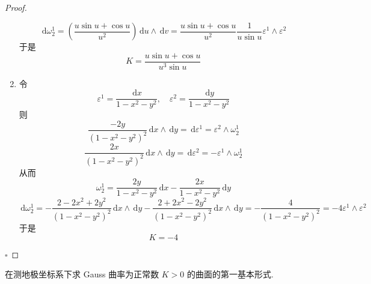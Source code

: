 \documentclass[../../main.tex]{subfiles}
\begin{document}
\begin{proof}
\begin{enumerate}
\[    \,\mathrm{d}  \omega _{2}^{1}= \left( \frac{u\sin u+ \cos u }{u^{2} }  \right)\,\mathrm{d} u\wedge \,\mathrm{d} v= \frac{u\sin u+ \cos u }{u^{2} }\frac{1 }{u\sin u } \varepsilon ^{1}\wedge  \varepsilon ^{2}   
    \]于是\[
    K= \frac{u\sin u+ \cos u }{u^{3}\sin u } 
    \]
    \item 令 \[
     \varepsilon ^{1}= \frac{\,\mathrm{d} x }{1-x^{2}-y^{2} },\quad  \varepsilon ^{2}= \frac{\,\mathrm{d} y }{1-x^{2}-y^{2} }  
    \]则 \[
    \frac{-2y }{\left( 1-x^{2}-y^{2} \right)^{2}  } \,\mathrm{d} x\wedge \,\mathrm{d} y= \,\mathrm{d}  \varepsilon ^{1}=  \varepsilon ^{2}\wedge  \omega _{2}^{1}
    \] \[
    \frac{2x }{\left( 1-x^{2}-y^{2} \right)^{2} }\,\mathrm{d} x\wedge \,\mathrm{d} y= \,\mathrm{d}  \varepsilon ^{2}= - \varepsilon ^{1}\wedge  \omega _{2}^{1} 
    \]从而 \[
     \omega _{2}^{1}= \frac{2y }{1-x^{2}-y^{2} } \,\mathrm{d} x-\frac{2x }{1-x^{2}-y^{2} } \,\mathrm{d} y
    \] \[
    \,\mathrm{d}  \omega _{2}^{1}= -\frac{2-2x^{2}+ 2y^{2} }{ \left( 1-x^{2}-y^{2} \right)^{2} } \,\mathrm{d} x\wedge \,\mathrm{d} y -\frac{2+ 2x^{2}-2y^{2} }{\left( 1-x^{2}-y^{2} \right)^{2}  }\,\mathrm{d} x\wedge \,\mathrm{d} y= -\frac{4 }{\left( 1-x^{2}-y^{2} \right)^{2}  }  = -4 \varepsilon ^{1}\wedge  \varepsilon ^{2}
    \]于是 \[
    K= -4
    \]
    \end{enumerate}
     

    \hfill $\square$
\end{proof}
\begin{problem}
 在测地极坐标系下求 Gauss 曲率为正常数 $K>0$ 的曲面的第一基本形式.
\end{problem}
\end{document}
